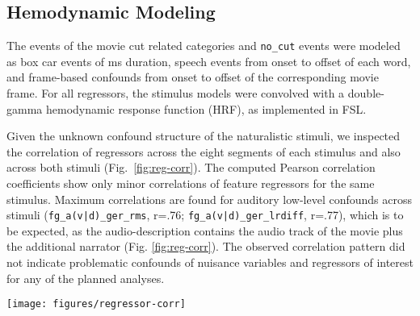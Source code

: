 \documentclass[english]{article}
\begin{document}
\subsection{Hemodynamic Modeling}

The events of the movie cut related categories and \texttt{no\_cut} events were
modeled as box car events of \unit[200]{ms} duration,
%
speech events from onset to offset of each word, and frame-based confounds from
onset to offset of the corresponding movie frame.
For all regressors, the stimulus models were convolved with a double-gamma
hemodynamic response function (HRF), as implemented in FSL.

Given the unknown confound structure of the naturalistic stimuli, we inspected
the correlation of regressors across the eight segments of each stimulus and
also across both stimuli (Fig.~\ref{fig:reg-corr}).
The computed Pearson correlation coefficients show only minor correlations of
feature regressors for the same stimulus.
Maximum correlations are found for auditory low-level confounds across stimuli
(\texttt{fg\_a(v|d)\_ger\_rms}, r=.76;
\texttt{fg\_a(v|d)\_ger\_lrdiff}, r=.77),
which is to be expected, as the audio-description contains the audio track of
the movie plus the additional narrator (Fig. \ref{fig:reg-corr}).
The observed correlation pattern did not indicate problematic confounds of
nuisance variables and regressors of interest for any of the planned
analyses.


\begin{figure*}[tbp]
\centering
    \texttt{[image: figures/regressor-corr]} \caption{Pearson
        correlation coefficients of modeled time series used as regressors in
        the GLM analysis of the
        audio-description (blue; Tab.~\ref{tab:ao-events} for a
        description) and audio-visual movie (red; Tab.~\ref{tab:av-events}).
        Values are rounded to the nearest tenth.
        The correlation between the two stimuli's
        root mean square volume and between their left-right difference in
        volume yielded the highest correlation values
        (\texttt{fg\_ad\_rms} and \texttt{fg\_av\_ger\_rms}, r=.7635;
        \texttt{fg\_ad\_lrdiff} and \texttt{fg\_av\_ger\_lrdiff}, r=.7749).
      }
\label{fig:reg-corr}
\end{figure*}
\end{document}

